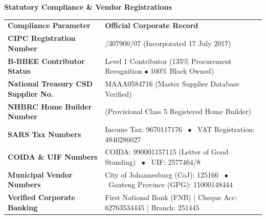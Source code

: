 \documentclass[a4paper,11pt]{article}
\begin{document}
\vfill

{\large\bfseries\color{mhnavy} Statutory Compliance \& Vendor Registrations}
\vspace{0.12cm}

\renewcommand{\arraystretch}{1.28}
\begin{tabularx}{\textwidth}{@{}p{4.8cm} X@{}}
\rowcolor{mhnavy}
{\color{white}\bfseries\fontsize{8.3pt}{10.2pt}\selectfont Compliance Parameter} & {\color{white}\bfseries\fontsize{8.3pt}{10.2pt}\selectfont Official Corporate Record} \\
\rowcolor{mhbluelight}
\fontsize{8.0pt}{10.0pt}\selectfont\bfseries CIPC Registration Number & \fontsize{8.0pt}{10.0pt}\selectfont 2017/307900/07 (Incorporated 17 July 2017) \\
\fontsize{8.0pt}{10.0pt}\selectfont\bfseries B-BBEE Contributor Status & \fontsize{8.0pt}{10.0pt}\selectfont Level 1 Contributor (135\% Procurement Recognition $\bullet$ 100\% Black Owned) \\
\rowcolor{mhbluelight}
\fontsize{8.0pt}{10.0pt}\selectfont\bfseries National Treasury CSD Supplier No. & \fontsize{8.0pt}{10.0pt}\selectfont MAAA0584716 (Master Supplier Database Verified) \\
\fontsize{8.0pt}{10.0pt}\selectfont\bfseries NHBRC Home Builder Number & \fontsize{8.0pt}{10.0pt}\selectfont 4000006217 (Provisional Class 5 Registered Home Builder) \\
\rowcolor{mhbluelight}
\fontsize{8.0pt}{10.0pt}\selectfont\bfseries SARS Tax Numbers & \fontsize{8.0pt}{10.0pt}\selectfont Income Tax: 9670117176 \ $\bullet$ \ VAT Registration: 4840286027 \\
\fontsize{8.0pt}{10.0pt}\selectfont\bfseries COIDA \& UIF Numbers & \fontsize{8.0pt}{10.0pt}\selectfont COIDA: 990001157115 (Letter of Good Standing) \ $\bullet$ \ UIF: 2577464/8 \\
\rowcolor{mhbluelight}
\fontsize{8.0pt}{10.0pt}\selectfont\bfseries Municipal Vendor Numbers & \fontsize{8.0pt}{10.0pt}\selectfont City of Johannesburg (CoJ): 125166 \ $\bullet$ \ Gauteng Province (GPG): 11000148444 \\
\fontsize{8.0pt}{10.0pt}\selectfont\bfseries Verified Corporate Banking & \fontsize{8.0pt}{10.0pt}\selectfont First National Bank (FNB) | Cheque Acc: 62763534445 | Branch: 251445 \\
\end{tabularx}
\renewcommand{\arraystretch}{1}

\vfill
\end{document}
